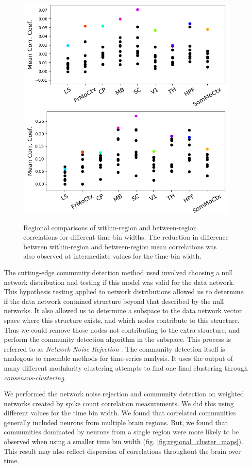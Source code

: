 \documentclass[a4paper,12pt]{article}
\theoremstyle{definition}
\begin{document}
\begin{figure}[t!]
    \centering
    \includegraphics[width=0.45\columnwidth]{images/Krebs_0p05_corr_comp.png}
    \includegraphics[width=0.45\columnwidth]{images/Krebs_3p0_corr_comp.png}
    \caption{Regional comparisons of within-region and between-region correlations for different time bin widths. The reduction in difference between within-region and between-region mean correlations was also observed at intermediate values for the time bin width.}
    \label{fig:within_between}
\end{figure}

The cutting-edge community detection method used involved choosing a null network distribution and testing if this model was valid for the data network. This hypothesis testing applied to network distributions allowed us to determine if the data network contained structure beyond that described by the null networks. It also allowed us to determine a subspace to the data network vector space where this structure exists, and which nodes contribute to this structure. Thus we could remove those nodes not contributing to the extra structure, and perform the community detection algorithm in the subspace. This process is referred to as \textit{Network Noise Rejection} \cite{humphries}. The community detection itself is analogous to ensemble methods for time-series analysis. It uses the output of many different modularity clustering attempts to find one final clustering through \textit{consensus-clustering}.

We performed the network noise rejection and community detection on weighted networks created by spike count correlation measurements. We did this using different values for the time bin width. We found that correlated communities generally included neurons from multiple brain regions. But, we found that communities dominated by neurons from a single region were more likely to be observed when using a smaller time bin width (fig. \ref{fig:regional_cluster_maps}). This result may also reflect dispersion of correlations throughout the brain over time.
\end{document}
